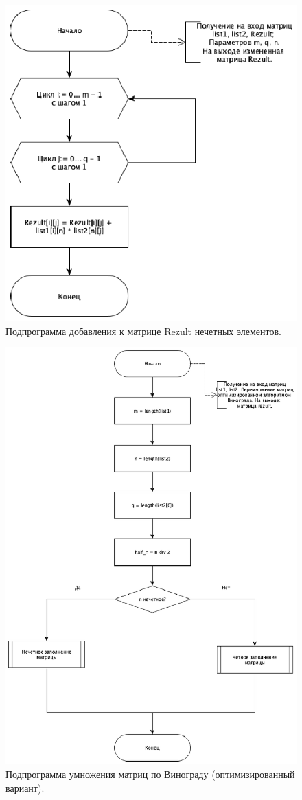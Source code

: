 \documentclass[12pt]{report}
\begin{document}
\begin{figure}[H]
	\centering
	\includegraphics[width=0.8\linewidth]{Grape_nechet}
	\caption{Подпрограмма добавления к матрице Rezult нечетных элементов.}
	\label{ris:image6}
\end{figure}

\newpage

\begin{figure}[H]
	\centering
	\includegraphics[width=0.8\linewidth]{Optymize_grape}
	\caption{Подпрограмма умножения матриц по Винограду (оптимизированный вариант).}
	\label{ris:image7}
\end{figure}
\end{document}
